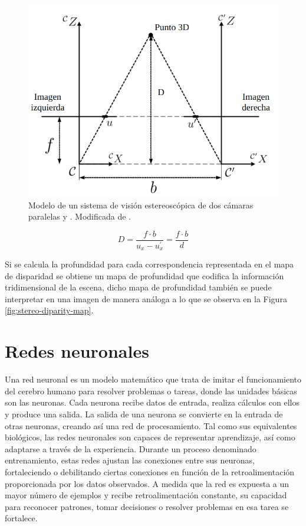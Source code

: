 \begin{figure}[H]
    \centering
    \includegraphics[scale=0.4]{partes/img/stereo-trangulation.png}
    \caption[Modelo de un sistema de visión estereoscópica de dos cámaras paralelas  y .]{Modelo de un sistema de visión estereoscópica de dos cámaras paralelas  y . Modificada de \cite{Alberto2010}.}
    \label{fig:stereo-triang}
\end{figure}

\begin{equation}
    \label{eq:stereo-depth}
    D =  \frac{f \cdot b}{u_x - u^{\prime}_x} = \frac{f \cdot b}{d}
\end{equation}

Si se calcula la profundidad  para cada correspondencia representada en el mapa de disparidad se obtiene un mapa de profundidad que codifica la información tridimensional de la escena, dicho mapa de profundidad también se puede interpretar en una imagen de manera análoga a lo que se observa en la Figura \ref{fig:stereo-diparity-map}.

\section{Redes neuronales}
\label{sec:teo-neural}

Una red neuronal es un modelo matemático que trata de imitar el funcionamiento del cerebro humano para resolver problemas o tareas, donde las unidades básicas son las neuronas. Cada neurona recibe datos de entrada, realiza cálculos con ellos y produce una salida. La salida de una neurona se convierte en la entrada de otras neuronas, creando así una red de procesamiento. Tal como sus equivalentes biológicos, las redes neuronales son capaces de representar aprendizaje, así como adaptarse a través de la experiencia. Durante un proceso denominado entrenamiento, estas redes ajustan las conexiones entre sus neuronas, fortaleciendo o debilitando ciertas conexiones en función de la retroalimentación proporcionada por los datos observados. A medida que la red es expuesta a un mayor número de ejemplos y recibe retroalimentación constante, su capacidad para reconocer patrones, tomar decisiones o resolver problemas en esa tarea se fortalece.

